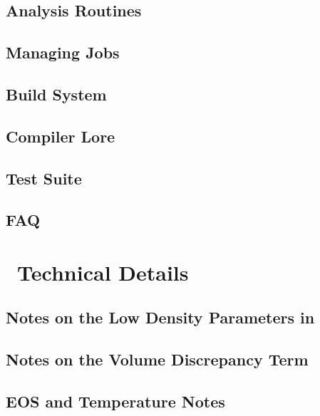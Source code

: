 \documentclass[11pt]{book}    %
\begin{document}
\chapter{Analysis Routines}


\chapter{Managing Jobs}


\chapter{Build System}


\chapter{Compiler Lore}


\chapter{Test Suite}


\chapter{FAQ}


\part{\maestro\ Technical Details}

\chapter{Notes on the Low Density Parameters in \maestro}


\chapter{Notes on the Volume Discrepancy Term}


\chapter{EOS and Temperature Notes}

\end{document}
